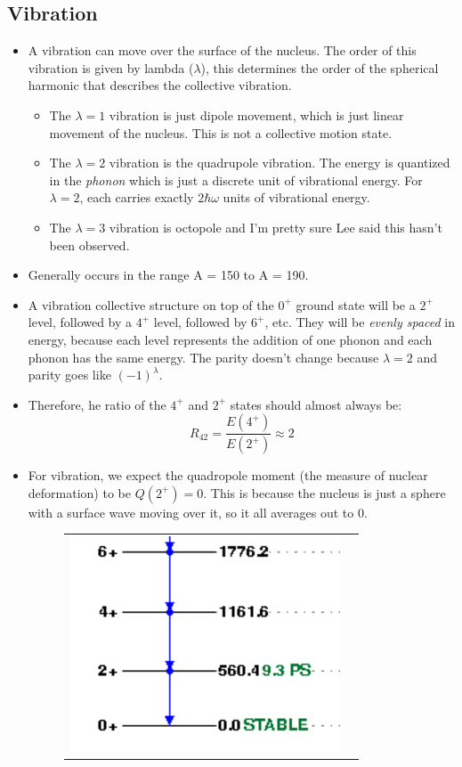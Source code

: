 \documentclass[letter]{article}
\begin{document}
\subsection{Vibration}
\begin{itemize}
\item A vibration can move over the surface of the nucleus. The order
  of this vibration is given by lambda ($\lambda$), this determines
  the order of the spherical harmonic that describes the collective vibration.
  \begin{itemize}
  \item The $\lambda=1$ vibration is just dipole movement, which
    is just linear movement of the nucleus. This is not a collective
    motion state.
  \item The $\lambda=2$ vibration is the quadrupole vibration. The
    energy is quantized in the \textit{phonon} which is just a
    discrete unit of vibrational energy. For $\lambda=2$, each carries
    exactly $2\hbar\omega$ units of vibrational energy.
  \item The $\lambda=3$ vibration is octopole and I'm pretty sure Lee
    said this hasn't been observed.
  \end{itemize}
\cite[Lec 13-16]{lecture}
\item Generally occurs in the range A = 150 to A = 190.
\item A vibration collective structure on top of the $0^+$ ground
  state will be a $2^+$ level, followed by a $4^+$ level, followed by
  $6^+$, etc.  They will be
  \textit{evenly spaced} in energy, because each level represents the
  addition of one phonon and each phonon has the same energy. The
  parity doesn't change because $\lambda=2$ and parity goes like
  $(-1)^\lambda$.~\cite[Lec 13-16]{lecture}
\item Therefore, he ratio of the $4^+$ and $2^+$ states should almost always be:
  \begin{equation*}
    R_{42}=\frac{E(4^+)}{E(2^+)} \approx 2
  \end{equation*}
\item For vibration, we expect the quadropole moment (the measure of
  nuclear deformation) to be $Q(2^+)=0$. This is because the nucleus
  is just a sphere with a surface wave moving over it, so it all
  averages out to 0.~\cite[Lec 13-16]{lecture}
  \begin{figure}[hbt]
    \centering
    \begin{tabular}{cc}
    \includegraphics{images/te_120_rot} &

\end{tabular}
\end{figure}
\end{itemize}
\end{document}
